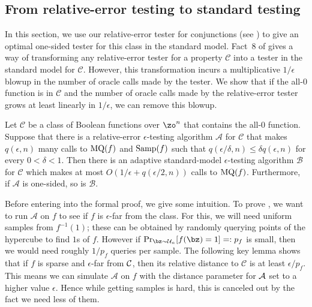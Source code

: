 \documentclass[11pt]{article}
\theoremstyle{definition}
\begin{document}
\subsection{From relative-error testing to standard testing} \label{sec:rel-error-to-standard}

In this section, we use our relative-error tester for conjunctions (see ) to give an optimal one-sided tester for this class in the standard model. Fact~8 of \cite{CDHLNSY2024} gives a way of transforming any relative-error tester for a property $\mathcal{C}$ into a tester in the standard model for $\mathcal{C}$. However, this transformation incurs a multiplicative $1/\epsilon$ blowup in the number of oracle calls made by the tester. We show that if the all-$0$ function is in $\mathcal{C}$ and the number of oracle calls made by the relative-error tester grows at least linearly in $1/\epsilon$, we can remove this blowup.
\begin{lemma}\label{thm: transormation }
Let $\mathcal{C}$ be a class of Boolean functions over $\zo^n$ that contains  the all-$0$ function. Suppose that there is a relative-error $\epsilon$-testing algorithm $\mathcal{A}$ for $\mathcal{C}$ that makes $q(\epsilon, n)$ many calls to $\mathrm{MQ}(f)$ and $\mathrm{Samp}(f)$ such that $q( \epsilon/\delta,n) \leq \delta q(\epsilon,n)$ for every $0<\delta<1$. 
Then there is an adaptive standard-model $\epsilon$-testing algorithm $\mathcal{B}$ for $\mathcal{C}$ which makes at most $O(1/\epsilon+q(\epsilon/2, n))$ calls to $\mathrm{MQ}(f)$. Furthermore, if $\mathcal{A}$ is one-sided, so is $\mathcal{B}$. 
\end{lemma}



Before entering into the formal proof, we give some intuition. To prove , we want to run $\mathcal{A}$ on $f$ to see if $f$ is $\epsilon$-far from the class. For this, we will need uniform samples from $f^{-1}(1)$; these can be obtained by randomly querying points of the hypercube to find $1$s of $f$. However if $\Pr_{\bz \sim \mathcal{U}_n}[f(\bz)=1]=:p_f$ is small, then we would need roughly $1/p_f$ queries per sample.
The following key lemma shows that if $f$ is sparse and $\epsilon$-far from $\cal{C}$, then its relative distance to $\mathcal{C}$ is at least $\epsilon/p_f$. This means we can simulate $\mathcal{A}$ on $f$ with the distance parameter for ${\cal A}$ set to a higher value $\epsilon$. Hence while getting samples is hard, this is canceled out by the fact we need less of them.
\end{document}
